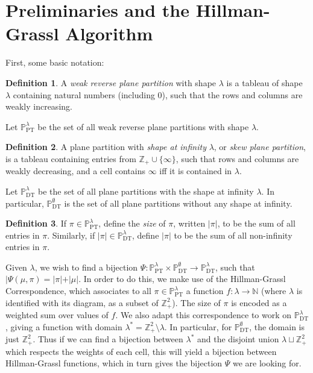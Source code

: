 \documentclass{amsart}
\newcommand{\pt}[1]{\mathbb{P}_\mathrm{PT}^{#1}}
\newcommand{\dt}[1]{\mathbb{P}_\mathrm{DT}^{#1}}
\newcommand{\ZZ}{\mathbb{Z}}
\newcommand{\NN}{\mathbb{N}}
\theoremstyle{definition}
\newtheorem{definition}{Definition}
\begin{document}
\section{Preliminaries and the Hillman-Grassl Algorithm}
First, some basic notation:

\begin{definition}
  A \emph{weak reverse plane partition} with shape $\lambda$ is a
  tableau of shape $\lambda$ containing natural numbers (including 0),
  such that the rows and columns are weakly increasing.
  
  Let $\pt{\lambda}$ be the set of all weak reverse plane partitions
  with shape $\lambda$.
\end{definition}
\begin{definition}
  A plane partition with \emph{shape at infinity} $\lambda$, or
  \emph{skew plane partition}, is a tableau containing entries from
  $\ZZ_+ \cup \{\infty\}$, such that rows and columns are weakly
  decreasing, and a cell contains $\infty$ iff it is contained in
  $\lambda$.
  
  Let $\dt{\lambda}$ be the set of all plane partitions with the shape
  at infinity $\lambda$.  In particular, $\dt{\emptyset}$ is the set of
  all plane partitions without any shape at infinity.
\end{definition}
\begin{definition}
  If $\pi \in \pt{\lambda}$, define the \emph{size} of $\pi$, written
  $|\pi|$, to be the sum of all entries in $\pi$.  Similarly, if
  $|\pi| \in \dt{\lambda}$, define $|\pi|$ to be the sum of all
  non-infinity entries in $\pi$.
\end{definition}

Given $\lambda$, we wish to find a bijection
$\Psi : \pt{\lambda} \times \dt{\emptyset} \to \dt{\lambda}$, such
that $|\Psi(\mu, \pi) = |\pi| + |\mu|$.  In order to do this, we make
use of the Hillman-Grassl Correspondence, which associates to all
$\pi \in \pt{\lambda}$ a function $f : \lambda \to \NN$ (where
$\lambda$ is identified with its diagram, as a subset of $\ZZ_+^2$).
The size of $\pi$ is encoded as a weighted sum over values of $f$.  We
also adapt this correspondence to work on $\dt{\lambda}$, giving a
function with domain $\lambda^* = \ZZ_+^2 \setminus \lambda$.  In
particular, for $\dt{\emptyset}$, the domain is just $\ZZ_+^2$.  Thus
if we can find a bijection between $\lambda^*$ and the disjoint union
$\lambda \sqcup \ZZ_+^2$ which respects the weights of each cell, this
will yield a bijection between Hillman-Grassl functions, which in turn
gives the bijection $\Psi$ we are looking for.
\end{document}

